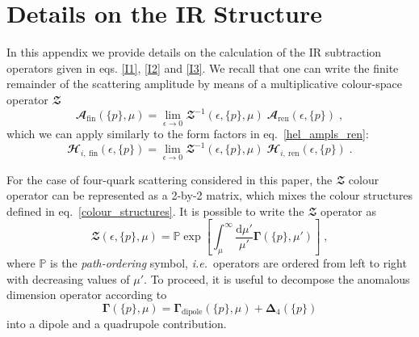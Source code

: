 
\section{Details on the IR Structure}
\label{sec:appB}
In this appendix we provide details on the calculation of the IR subtraction operators given in eqs. \eqref{I1}, \eqref{I2} and \eqref{I3}.  We recall that one can write the finite remainder of the scattering amplitude by means of a multiplicative colour-space operator $\mathbfcal{Z}$ 
\begin{equation}\label{Zeta_A_B}
\mathbfcal{A}_\text{fin} (\{p\},\mu)= \lim_{\epsilon \rightarrow 0} \mathbfcal{Z}^{-1}(\epsilon,\{p\},\mu) \; \mathbfcal{A}_{\text{ren}}(\epsilon,\{p\}) \; ,
\end{equation}
which we can apply similarly to the form factors in eq.~\eqref{hel_ampls_ren}: 
\begin{equation}\label{Zeta_H_B}
\mathbfcal{H}_{i,\:\text{fin}} (\epsilon,\{p\})= \lim_{\epsilon \rightarrow 0} \mathbfcal{Z}^{-1}(\epsilon,\{p\},\mu) \; \mathbfcal{H}_{i,\:\text{ren}}(\epsilon,\{p\}) \; .
\end{equation}

For the case of four-quark scattering considered in this paper, the
$\mathbfcal{Z}$ colour operator can be represented as a 2-by-2 matrix,
which mixes the colour structures defined in
eq.~\eqref{colour_structures}.
It is possible to write the $\mathbfcal Z$ operator
as~\cite{Becher:2009qa,Becher:2009cu}
\begin{equation}\label{exponentiation_B}
\mathbfcal{Z} (\epsilon,\{p\},\mu) = \mathbb{P} \exp \left[
  \int_\mu^\infty \frac{\mathrm{d} \mu'}{\mu'}
  \mathbf{\Gamma}(\{p\},\mu')\right] \; ,
\end{equation}
where $\mathbb{P}$ is the \textit{path-ordering} symbol, {\it i.e.}\
operators are ordered from left to right with decreasing values of $\mu'$.
To proceed, it is  useful to decompose the 
anomalous dimension operator according to
\begin{equation}\label{anomalous_operator_B}
\mathbf{\Gamma}(\{p\},\mu) =  \mathbf{\Gamma}_{\text{dipole}}(\{p\},\mu)  + \mathbf{\Delta}_4 (\{p\}) 
\end{equation}
into a dipole and a quadrupole contribution.

